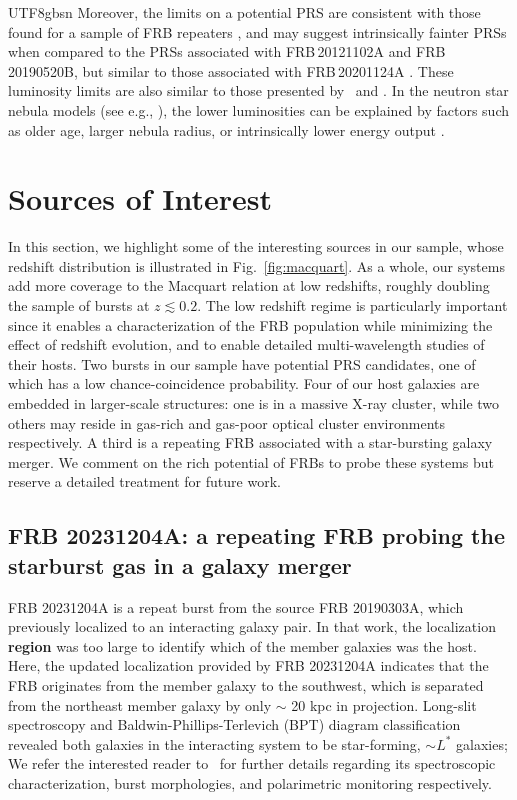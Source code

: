 \documentclass[twocolumn,linenumbers]{aastex631}
\newcommand{\msbold}[1]{\textbf{#1}}
\begin{document}
\begin{CJK*}{UTF8}{gbsn}
Moreover, the limits on a potential PRS are consistent with those found for a sample of FRB repeaters \citep{Ibik2024prs}, and may suggest intrinsically fainter PRSs when compared to the PRSs associated with FRB\,20121102A and FRB\,20190520B, but similar to those associated with FRB\,20201124A \citep{Bruni2024Nature}. These luminosity limits are also similar to those presented by~\citet{Eftekhari2020} and \citet{Dong2024radiosources}. In the neutron star nebula models (see e.g., \citealt{Kashiyama2017, margalit2018concordance}), the lower luminosities can be explained by factors such as older age, larger nebula radius, or intrinsically lower energy output \citep{Margalit2019nebulae}. 

\section{Sources of Interest}\label{sec:sample}
In this section, we highlight some of the interesting sources in our sample, whose redshift distribution is illustrated in Fig.~\ref{fig:macquart}. As a whole, our systems add more coverage to the Macquart relation at low redshifts, roughly doubling the sample of bursts at $z \lesssim 0.2$. The low redshift regime is particularly important since it enables a characterization of the FRB population while minimizing the effect of redshift evolution, and to enable detailed multi-wavelength studies of their hosts. Two bursts in our sample have potential PRS candidates, one of which has a low chance-coincidence probability. Four of our host galaxies are embedded in larger-scale structures: one is in a massive X-ray cluster, while two others may reside in gas-rich and gas-poor optical cluster environments respectively. A third is a repeating FRB associated with a star-bursting galaxy merger. We comment on the rich potential of FRBs to probe these systems but reserve a detailed treatment for future work.

\subsection{FRB 20231204A: a repeating FRB probing the starburst gas in a galaxy merger}\label{sec:FRB20231204A}
FRB 20231204A is a repeat burst from the source FRB 20190303A, which~\citet{michilli2023subarcminute} previously localized to an interacting galaxy pair. In that work, the localization \msbold{region} was too large to identify which of the member galaxies was the host. Here, the updated localization provided by FRB 20231204A indicates that the FRB  originates from the member galaxy to the southwest, which is separated from the northeast member galaxy by only $\sim$ 20 kpc in projection. Long-slit spectroscopy and Baldwin-Phillips-Terlevich (BPT) diagram classification revealed both galaxies in the interacting system to be star-forming, $\sim L^*$ galaxies; We refer the interested reader to~\citet{michilli2023subarcminute,curtin2024morphology,ng2024polarization} for further details regarding its spectroscopic characterization, burst morphologies, and polarimetric monitoring respectively.


\end{CJK*}
\end{document}
